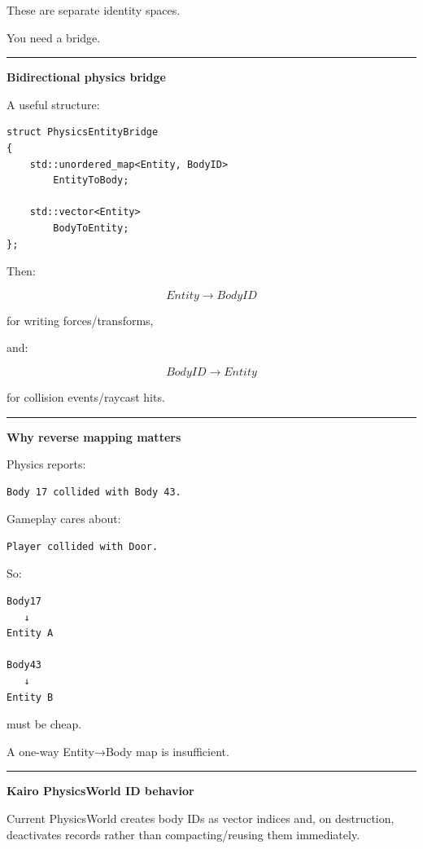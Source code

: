 These are separate identity spaces.

You need a bridge.

\begin{center}\rule{0.5\linewidth}{0.5pt}\end{center}

\textbf{Bidirectional physics bridge}

A useful structure:

\begin{verbatim}
struct PhysicsEntityBridge
{
    std::unordered_map<Entity, BodyID>
        EntityToBody;

    std::vector<Entity>
        BodyToEntity;
};
\end{verbatim}

Then:

\[
Entity\rightarrow BodyID
\]

for writing forces/transforms,

and:

\[
BodyID\rightarrow Entity
\]

for collision events/raycast hits.

\begin{center}\rule{0.5\linewidth}{0.5pt}\end{center}

\textbf{Why reverse mapping matters}

Physics reports:

\begin{verbatim}
Body 17 collided with Body 43.
\end{verbatim}

Gameplay cares about:

\begin{verbatim}
Player collided with Door.
\end{verbatim}

So:

\begin{verbatim}
Body17
   ↓
Entity A

Body43
   ↓
Entity B
\end{verbatim}

must be cheap.

A one-way Entity→Body map is insufficient.

\begin{center}\rule{0.5\linewidth}{0.5pt}\end{center}

\textbf{Kairo PhysicsWorld ID behavior}

Current PhysicsWorld creates body IDs as vector indices and, on destruction, deactivates records rather than compacting/reusing them immediately.

